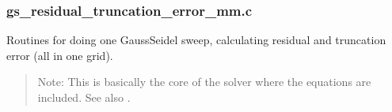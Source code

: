 \documentclass[letterpaper,10pt,english]{sphinxmanual}
\begin{document}
\subsubsection{gs\_residual\_truncation\_error\_mm.c}
\label{\detokenize{sphinx-c-apidoc/output/gravity/mond_mass/gs_residual_truncation_error_mm_c:gs-residual-truncation-error-mm-c}}\label{\detokenize{sphinx-c-apidoc/output/gravity/mond_mass/gs_residual_truncation_error_mm_c::doc}}
Routines for doing one Gauss\sphinxhyphen{}Seidel sweep, calculating residual and
truncation error (all in one grid).
\begin{quote}

Note:
This is basically the core of the solver where the equations are included.
See also .
\end{quote}

\begin{fulllineitems}
\label{\detokenize{sphinx-c-apidoc/output/gravity/mond_mass/gs_residual_truncation_error_mm_c:c.gs_mm}}%
\pysigstartmultiline
{}%
\pysigstopmultiline
\end{fulllineitems}

\end{document}
